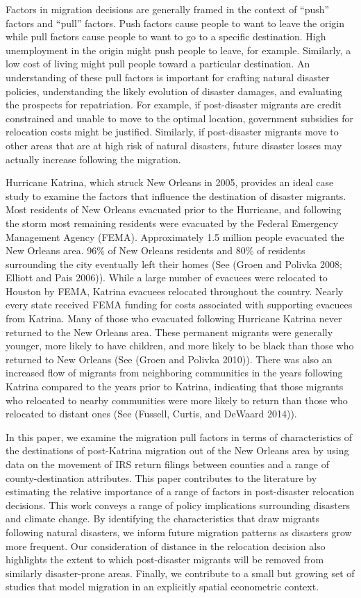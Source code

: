 \documentclass[]{article}
\begin{document}
Factors in migration decisions are generally framed in the context of
``push'' factors and ``pull'' factors. Push factors cause people to want
to leave the origin while pull factors cause people to want to go to a
specific destination. High unemployment in the origin might push people
to leave, for example. Similarly, a low cost of living might pull people
toward a particular destination. An understanding of these pull factors
is important for crafting natural disaster policies, understanding the
likely evolution of disaster damages, and evaluating the prospects for
repatriation. For example, if post-disaster migrants are credit
constrained and unable to move to the optimal location, government
subsidies for relocation costs might be justified. Similarly, if
post-disaster migrants move to other areas that are at high risk of
natural disasters, future disaster losses may actually increase
following the migration.

Hurricane Katrina, which struck New Orleans in 2005, provides an ideal
case study to examine the factors that influence the destination of
disaster migrants. Most residents of New Orleans evacuated prior to the
Hurricane, and following the storm most remaining residents were
evacuated by the Federal Emergency Management Agency (FEMA).
Approximately 1.5 million people evacuated the New Orleans area. 96\% of
New Orleans residents and 80\% of residents surrounding the city
eventually left their homes (See (Groen and Polivka 2008; Elliott and
Pais 2006)). While a large number of evacuees were relocated to Houston
by FEMA, Katrina evacuees relocated throughout the country. Nearly every
state received FEMA funding for costs associated with supporting
evacuees from Katrina. Many of those who evacuated following Hurricane
Katrina never returned to the New Orleans area. These permanent migrants
were generally younger, more likely to have children, and more likely to
be black than those who returned to New Orleans (See (Groen and Polivka
2010)). There was also an increased flow of migrants from neighboring
communities in the years following Katrina compared to the years prior
to Katrina, indicating that those migrants who relocated to nearby
communities were more likely to return than those who relocated to
distant ones (See (Fussell, Curtis, and DeWaard 2014)).

In this paper, we examine the migration pull factors in terms of
characteristics of the destinations of post-Katrina migration out of the
New Orleans area by using data on the movement of IRS return filings
between counties and a range of county-destination attributes. This
paper contributes to the literature by estimating the relative
importance of a range of factors in post-disaster relocation decisions.
This work conveys a range of policy implications surrounding disasters
and climate change. By identifying the characteristics that draw
migrants following natural disasters, we inform future migration
patterns as disasters grow more frequent. Our consideration of distance
in the relocation decision also highlights the extent to which
post-disaster migrants will be removed from similarly disaster-prone
areas. Finally, we contribute to a small but growing set of studies that
model migration in an explicitly spatial econometric context.
\end{document}
